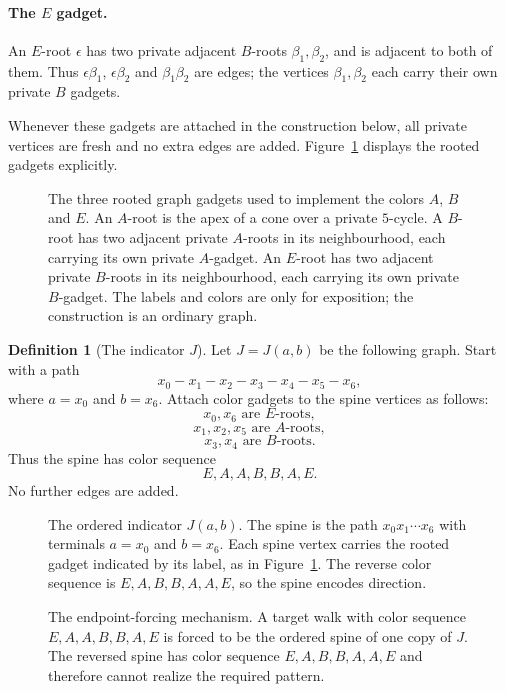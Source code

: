 \documentclass[11pt]{amsart}
\theoremstyle{plain}
\theoremstyle{definition}
\newtheorem{definition}[theorem]{Definition}
\begin{document}
\paragraph{The $E$ gadget.}
An $E$-root $\epsilon$ has two private adjacent $B$-roots $\beta_1,\beta_2$, and is adjacent to both of them.  Thus $\epsilon\beta_1$, $\epsilon\beta_2$ and $\beta_1\beta_2$ are edges; the vertices $\beta_1,\beta_2$ each carry their own private $B$ gadgets.

Whenever these gadgets are attached in the construction below, all private vertices are fresh and no extra edges are added.  Figure~\ref{fig:color-gadgets} displays the rooted gadgets explicitly.


\begin{figure}[htbp]
\centering

\caption{The three rooted graph gadgets used to implement the colors $A$, $B$ and $E$.  An $A$-root is the apex of a cone over a private $5$-cycle.  A $B$-root has two adjacent private $A$-roots in its neighbourhood, each carrying its own private $A$-gadget.  An $E$-root has two adjacent private $B$-roots in its neighbourhood, each carrying its own private $B$-gadget.  The labels and colors are only for exposition; the construction is an ordinary graph.}
\label{fig:color-gadgets}
\end{figure}


\begin{definition}[The indicator $J$]\label{def:indicator}
Let $J=J(a,b)$ be the following graph.  Start with a path
\[
   x_0-x_1-x_2-x_3-x_4-x_5-x_6,
\]
where $a=x_0$ and $b=x_6$.  Attach color gadgets to the spine vertices as follows:
\[
   x_0,x_6\text{ are }E\text{-roots},
\]
\[
   x_1,x_2,x_5\text{ are }A\text{-roots},
\]
\[
   x_3,x_4\text{ are }B\text{-roots}.
\]
Thus the spine has color sequence
\[
   E,A,A,B,B,A,E.
\]
No further edges are added.
\end{definition}


\begin{figure}[htbp]
\centering

\caption{The ordered indicator $J(a,b)$.  The spine is the path $x_0x_1\cdots x_6$ with terminals $a=x_0$ and $b=x_6$.  Each spine vertex carries the rooted gadget indicated by its label, as in Figure~\ref{fig:color-gadgets}.  The reverse color sequence is $E,A,B,B,A,A,E$, so the spine encodes direction.}
\label{fig:indicator-spine}
\end{figure}

\begin{figure}[htbp]
\centering

\caption{The endpoint-forcing mechanism.  A target walk with color sequence $E,A,A,B,B,A,E$ is forced to be the ordered spine of one copy of $J$.  The reversed spine has color sequence $E,A,B,B,A,A,E$ and therefore cannot realize the required pattern.}
\label{fig:endpoint-mechanism}
\end{figure}
\end{document}
